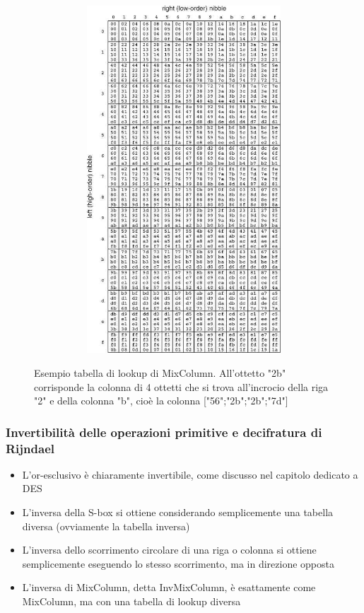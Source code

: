 \begin{figure}[htbp]
	\centering%
	\subfigure%
	{\includegraphics[height=13cm, width=13cm, keepaspectratio]{Immagini/chiave_segreta/rijndael_mixcol_lookup.png}}
	\caption{Esempio tabella di lookup di MixColumn. All'ottetto "2b" corrisponde la colonna di 4 ottetti che si trova all'incrocio della riga "2" e della colonna "b", cioè la colonna ["56";"2b";"2b";"7d"] \label{fig:Rij_mixcol_lookup}} 	
\end{figure}

\subsubsection{Invertibilità delle operazioni primitive e decifratura di Rijndael}
\begin{itemize}
  \item L'or-esclusivo è chiaramente invertibile, come discusso nel capitolo dedicato a DES
  \item L'inversa della S-box si ottiene considerando semplicemente una tabella diversa (ovviamente la tabella inversa)
  \item L'inversa dello scorrimento circolare di una riga o colonna si ottiene semplicemente eseguendo lo stesso scorrimento, ma in direzione opposta
  \item L'inversa di MixColumn, detta InvMixColumn, è esattamente come MixColumn, ma con una tabella di lookup diversa
\end{itemize}

